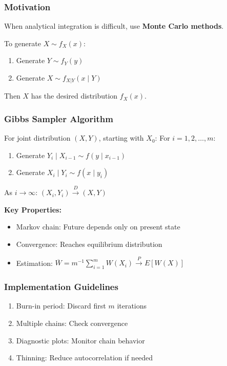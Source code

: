 \subsubsection{Motivation}

When analytical integration is difficult, use \textbf{Monte Carlo methods}.

\begin{theorem}
To generate $X \sim f_X(x)$:
	\begin{enumerate}
		\item Generate $Y \sim f_Y(y)$
		\item Generate $X \sim f_{X|Y}(x \mid Y)$
	\end{enumerate}
Then $X$ has the desired distribution $f_X(x)$.
\end{theorem}
\subsubsection{Gibbs Sampler Algorithm}

\begin{definition}
For joint distribution $(X,Y)$, starting with $X_0$:
For $i = 1, 2, \ldots, m$:
	\begin{enumerate}
		\item Generate $Y_i \mid X_{i-1} \sim f(y \mid x_{i-1})$
		\item Generate $X_i \mid Y_i \sim f(x \mid y_i)$
	\end{enumerate}
As $i \to \infty$: $(X_i, Y_i) \xrightarrow{D} (X,Y)$
\end{definition}
\textbf{Key Properties:}

\begin{itemize}
	\item Markov chain: Future depends only on present state
	\item Convergence: Reaches equilibrium distribution
	\item Estimation: $\overline{W} = m^{-1}\sum_{i=1}^m W(X_i) \xrightarrow{P} E[W(X)]$
\end{itemize}

\subsubsection{Implementation Guidelines}

\begin{enumerate}
	\item Burn-in period: Discard first $m$ iterations
	\item Multiple chains: Check convergence
	\item Diagnostic plots: Monitor chain behavior
	\item Thinning: Reduce autocorrelation if needed
\end{enumerate}

